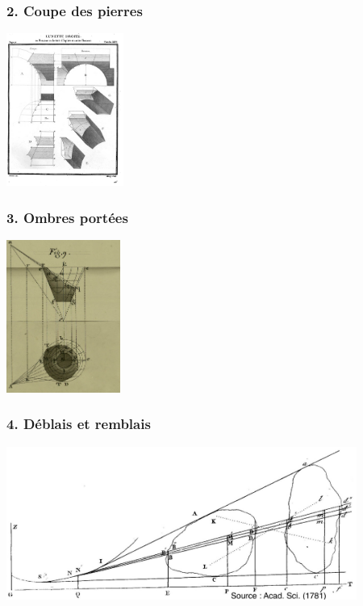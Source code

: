 \documentclass[9pt]{beamer}
\begin{document}
\begin{frame}
\frametitle{\bf 2. Coupe des pierres}
 
\centering \includegraphics[height=5.0cm]{pierres}

\end{frame}

\begin{frame}
\frametitle{\bf 3. Ombres port\'ees}
 
\centering \includegraphics[height=5.0cm]{ombres}

\end{frame}

\begin{frame}
\frametitle{\bf 4. D\'eblais et remblais}
 
\centering \includegraphics[height=5.0cm]{deblais}

\end{frame}
\end{document}
